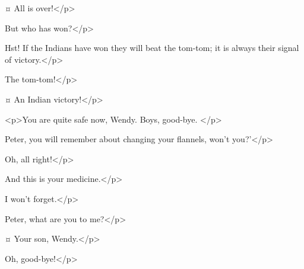 \peterspeaks {}¤
All is over!</p>

\wendyspeaks
But who has won?</p>

\peterspeaks
Hst!
If the Indians have won they will beat the tom-tom; it is always their signal of victory.</p>


\tootlesspeaks
The tom-tom!</p>

\peterspeaks {}¤
An Indian victory!</p>


<p>You are quite safe now, Wendy.
Boys, good-bye.
</p>

\wendyspeaks
Peter, you will remember about changing your flannels, won't you?'</p>

\peterspeaks
Oh, all right!</p>

\wendyspeaks
And this is your medicine.</p>


\peterspeaks
I won't forget.</p>

\wendyspeaks
Peter, what are you to me?</p>

\peterspeaks {}¤
Your son, Wendy.</p>

\wendyspeaks
Oh, good-bye!</p>

